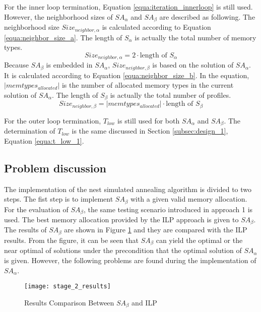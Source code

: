 		For the inner loop termination, Equation \ref{equa:iteration_innerloop} is still used.
		However, the neighborhood sizes of $SA_{\alpha}$ and $SA_{\beta}$
		are described as following.
		The neighborhood size $Size_{neighbor,\alpha}$ is calculated according
		to Equation \ref{equa:neighbor_size_a}.
		The length of $S_{\alpha}$ is actually the total number of memory types.
		\begin{equation}
		\label{equa:neighbor_size_a}
			Size_{neighbor,\alpha}=2 \cdot \text{length of } S_{\alpha} 
		\end{equation}
		Because $SA_{\beta}$ is embedded in $SA_{\alpha}$, $Size_{neighbor,\beta}$ is
		based on the solution of $SA_{\alpha}$.
		It is calculated according to Equation \ref{equa:neighbor_size_b}.
		In the equation, $\lvert memtypes_{allocated} \rvert$ is the number of
		allocated memory types in the current solution of $SA_{\alpha}$.
		The length of $S_{\beta}$ is actually the total number of profiles.
		\begin{equation}
		\label{equa:neighbor_size_b}
			Size_{neighbor,\beta}=\lvert memtypes_{allocated} \rvert \cdot \text{length of } S_{\beta} 
		\end{equation}
		
		For the outer loop termination, $T_{low}$ is still used for both
		$SA_{\alpha}$ and $SA_{\beta}$.
		The determination of $T_{low}$ is the same discussed in Section
		\ref{subsec:design_1}, Equation \ref{equa:t_low_1}.
	
		\subsection{Problem discussion}
		\label{subsec:problem_2}
		The implementation of the nest simulated annealing algorithm is divided to two steps.
		The fist step is to implement $SA_{\beta}$ with a given valid memory allocation.
		For the evaluation of $SA_{\beta}$, the same testing scenario introduced in approach 1
		is used. The best memory allocation provided by the ILP approach is given to $SA_{\beta}$.
		The results of $SA_{\beta}$ are shown in
		Figure \ref{fig:stage_2_results} and they are compared with the ILP results.
		From the figure, it can be seen that $SA_{\beta}$ can yield the optimal or the
		near optimal of solutions under the precondition that the optimal solution of
		$SA_{\alpha}$ is given.
		However, the following problems are found during the implementation of $SA_{\alpha}$.
		\begin{figure}[h]
			\begin{center}
				\texttt{[image: stage\_2\_results]}
				\caption{Results Comparison Between $SA_{\beta}$ and ILP}
				\label{fig:stage_2_results}
			\end{center}
		\end{figure}		
		
